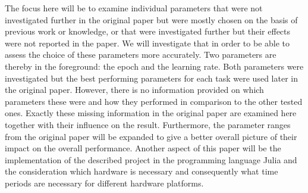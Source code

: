 The focus here will be to examine individual parameters that were not investigated further in the original paper but were mostly chosen on the basis of previous work or knowledge, or that were investigated further but their effects were not reported in the paper. We will investigate that in order to be able to assess the choice of these parameters more accurately. Two parameters are thereby in the foreground: the epoch and the learning rate. Both parameters were investigated but the best performing parameters for each task were used later in the original paper. However, there is no information provided on which parameters these were and how they performed in comparison to the other tested ones. Exactly these missing information in the original paper are examined here together with their influence on the result. Furthermore, the parameter ranges from the original paper will be expanded to give a better overall picture of their impact on the overall performance.  Another aspect of this paper will be the implementation of the described project in the programming language Julia and the consideration which hardware is necessary and consequently what time periods are necessary for different hardware platforms. 
